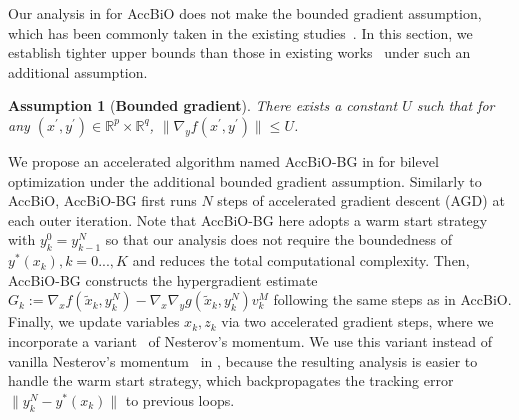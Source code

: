 \documentclass{osudissert96}
\newtheorem{assum}{Assumption}
\begin{document}
Our analysis in  for AccBiO does not make the bounded gradient assumption, which has been commonly taken in the existing studies~\cite{ghadimi2018approximation,ji2020bilevel,hong2020two,ji2020convergence}. 
In this section, we establish tighter upper bounds than those in existing works~\cite{ghadimi2018approximation,ji2020bilevel} under such an additional assumption.  


\begin{assum}[{\bf Bounded gradient}]\label{bounded_f_assump}
There exists a constant $U$ such that for any $(x^\prime,y^\prime)\in\mathbb{R}^p\times \mathbb{R}^q$, $\|\nabla_y f(x^\prime,y^\prime)\|\leq U$.
\end{assum}

We propose an accelerated algorithm named AccBiO-BG in  for bilevel optimization under the additional bounded gradient assumption. Similarly to  AccBiO, AccBiO-BG first runs $N$ steps of accelerated gradient descent (AGD) at each outer iteration. Note that AccBiO-BG here adopts a warm start strategy with $y_k^0=y_{k-1}^N$ so that our analysis does not require the boundedness of $y^*(x_k),k=0...,K$ and reduces the total computational complexity. %
Then, 
AccBiO-BG constructs the hypergradient estimate $G_k:= \nabla_x f(\widetilde x_k,y_k^N) -\nabla_x \nabla_y g(\widetilde x_k,y_k^N)v_k^M$ following the same steps as in AccBiO. 
Finally, we update variables $x_{k},z_{k}$ via two  accelerated gradient steps, where we incorporate a variant~\cite{ghadimi2016accelerated} of Nesterov's momentum. We use this variant instead of vanilla Nesterov's momentum~\cite{nesterov2018lectures} in , because the resulting analysis is easier to handle the warm start strategy, which backpropagates the tracking error $\|y^N_k-y^*(x_k)\|$ to previous loops. 

\end{document}
